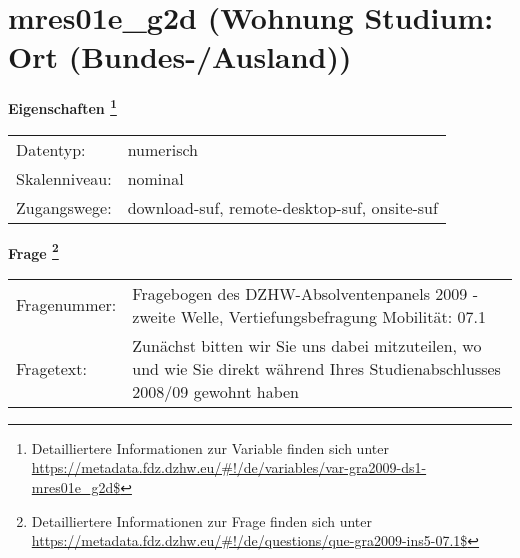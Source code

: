 
    \setcounter{footnote}{0}

    \vspace*{-1.8cm}
	\section{mres01e\_g2d (Wohnung Studium: Ort (Bundes-/Ausland))}
	\label{section:mres01e_g2d}



    \vspace*{0.5cm}
    \noindent\textbf{Eigenschaften
	\footnote{Detailliertere Informationen zur Variable finden sich unter
		\url{https://metadata.fdz.dzhw.eu/\#!/de/variables/var-gra2009-ds1-mres01e_g2d$}}}\\
	\begin{tabularx}{\hsize}{@{}lX}
	Datentyp: & numerisch \\
	Skalenniveau: & nominal \\
	Zugangswege: &
	  download-suf, 
	  remote-desktop-suf, 
	  onsite-suf
 \\
    \end{tabularx}



				\vspace*{0.5cm}
                \noindent\textbf{Frage
	                \footnote{Detailliertere Informationen zur Frage finden sich unter
		              \url{https://metadata.fdz.dzhw.eu/\#!/de/questions/que-gra2009-ins5-07.1$}}}\\
				\begin{tabularx}{\hsize}{@{}lX}
					Fragenummer: &
					  Fragebogen des DZHW-Absolventenpanels 2009 - zweite Welle, Vertiefungsbefragung Mobilität:
					  07.1
 \\
					Fragetext: & Zunächst bitten wir Sie uns dabei mitzuteilen, wo und wie Sie direkt während Ihres Studienabschlusses 2008/09 gewohnt haben \\
				\end{tabularx}





